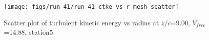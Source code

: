 \begin{figure}[H]
\centering
\texttt{[image: figs/run\_41/run\_41\_ctke\_vs\_r\_mesh\_scatter]}
\caption{Scatter plot of turbulent kinetic energy vs radius at $z/c$=9.00, $V_{free}$=14.88, station5}
\label{fig:run_41_ctke_vs_r_mesh_scatter}
\end{figure}


